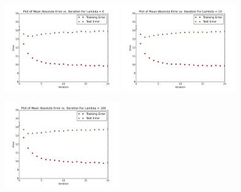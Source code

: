 \documentclass[10.5pt]{article}
\newcommand{\factwidth}{0.44}
\newcommand{\factheight}{1.6in}
\begin{document}
\begin{figure}[H]
\centering
\includegraphics[width=0\factwidth\textwidth,height=\factheight]{matrix_plots/test-i40d25l0.png}
\includegraphics[width=0\factwidth\textwidth,height=\factheight]{matrix_plots/test-i40d25l10.png}
\includegraphics[width=0\factwidth\textwidth,height=\factheight]{matrix_plots/test-i40d25l100.png}

\end{figure}
\end{document}
